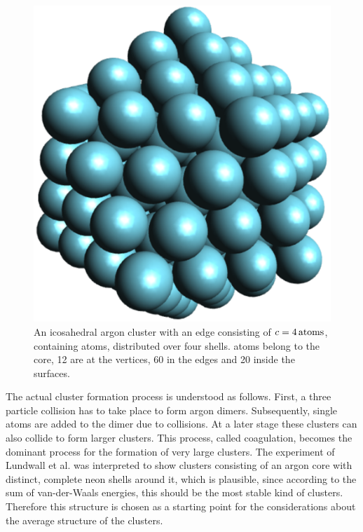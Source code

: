 \begin{figure}[!ht]
 \centering
 \includegraphics[scale=0.5]{pics/Ar_pure.eps}                        
 \caption{An icosahedral argon cluster with an edge consisting of 
          $c=\unit[4]{atoms}$, containing \unit[147]{atoms},
          distributed over four shells. \unit[55]{atoms} belong
          to the core, 12 are at the vertices, 60 in the edges and 20 inside the
          surfaces.}
 \label{figure:Ar_pure}
\end{figure}    

The actual cluster formation process is understood as follows. First, a three particle
collision has to take place to form argon dimers. Subsequently, single atoms are added to the dimer 
due to collisions. At a later stage these clusters can also collide to form larger clusters. This process,
called coagulation, becomes the dominant process for the formation of very large clusters. 
The experiment of Lundwall et al. \cite{Lundwall07} was interpreted to
show clusters consisting of an argon core with distinct, complete neon
shells around it, which is plausible, since according to the sum of van-der-Waals
energies, this should be the most stable kind of clusters.
Therefore this structure is chosen as a starting point for the considerations
about the average structure of the clusters.

